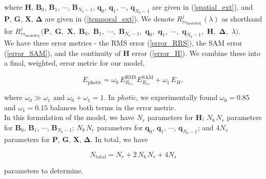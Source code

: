 \documentclass[12pt]{article}
\numberwithin{equation}{section}
\begin{document}
\medskip

\noindent where \textbf{H}, $\textbf{B}_0$, $\textbf{B}_1$, $\cdots$, $\textbf{B}_{N_b-1}$, $\textbf{q}_0$, 
$\textbf{q}_1$, $\cdots$, $\textbf{q}_{N_b-1}$ are given in (\ref{spatial_ext}), and \textbf{P}, 
\textbf{G}, \textbf{X}, $\mathbf{\Delta}$ are given in (\ref{temporal_ext}). We denote $R_{rs_{{\text{modelled}}_i}}^j(\lambda)$ 
as shorthand for 
$R_{rs_{{\text{modelled}}_i}}^j(\textbf{P},$ $\textbf{G},$ $\textbf{X},$ $\textbf{B}_0,$ $\textbf{B}_1,$ $\cdots,$ $\textbf{B}_{N_b-1},$ $\textbf{q}_0,$ $\textbf{q}_1,$ $\cdots,$ $\textbf{q}_{N_b-1},$ $\textbf{H},$ $\mathbf{\Delta},$ $\lambda)$. \\ 

We have three error metrics - the RMS error (\ref{error_RRS}), the SAM error 
(\ref{error_SAM}), and the continuity of \textbf{H} error (\ref{error_H}). We combine 
these into a final, weighted, error metric for our model, 
\begin{linenomath}
\begin{equation}
E_{\text{photic}} = \omega_0 \, E_{R_{rs}}^{\text{RMS}} E_{R_{rs}}^{\text{SAM}} + \omega_1 \, E_{H},
\end{equation}
\end{linenomath}
where $\omega_0 \gg \omega_1$ and $\omega_0 + \omega_1 = 1$. In \textit{photic}, we experimentally 
found $\omega_0 = 0.85$ and $\omega_1 = 0.15$ balances both terms in the error metric. \\

In this formulation of the model, we have $N_r$ parameters for \textbf{H}; $N_b\,N_r$ parameters 
for $\textbf{B}_0$, $\textbf{B}_1$, $\cdots$, $\textbf{B}_{N_b-1}$; $N_b\,N_r$ parameters for 
$\textbf{q}_0$, $\textbf{q}_1$, $\cdots$, $\textbf{q}_{N_b-1}$; and $4 N_s$ parameters for 
\textbf{P}, \textbf{G}, \textbf{X}, $\mathbf{\Delta}$. In total, we have 
\begin{linenomath}
\begin{equation*}
N_{\text{total}} = N_r + 2\,N_b\,N_r + 4 N_s
\end{equation*}
\end{linenomath}
parameters to determine. \\
\end{document}
